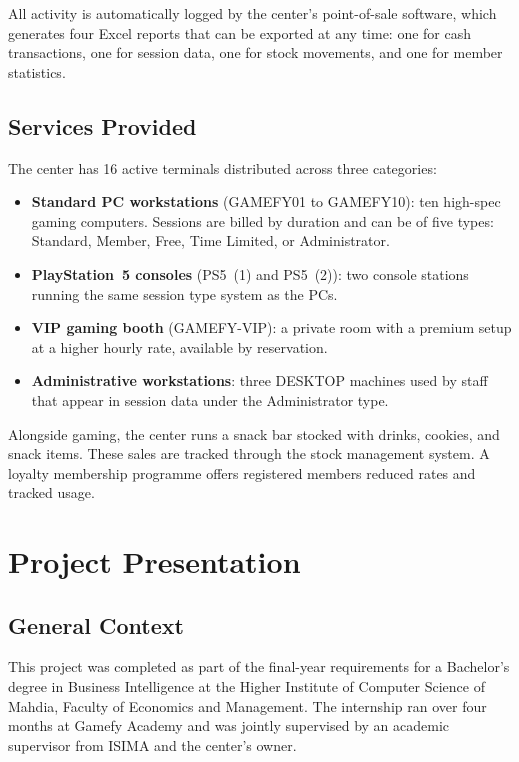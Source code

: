 \documentclass[12pt, a4paper]{report}
\begin{document}
All activity is automatically logged by the center's point-of-sale software, which
generates four Excel reports that can be exported at any time: one for cash
transactions, one for session data, one for stock movements, and one for member
statistics.

\subsection{Services Provided}

The center has 16 active terminals distributed across three categories:

\begin{itemize}
  \item \textbf{Standard PC workstations} (GAMEFY01 to GAMEFY10): ten high-spec
        gaming computers. Sessions are billed by duration and can be of five types:
        Standard, Member, Free, Time Limited, or Administrator.

  \item \textbf{PlayStation~5 consoles} (PS5~(1) and PS5~(2)): two console stations
        running the same session type system as the PCs.

  \item \textbf{VIP gaming booth} (GAMEFY-VIP): a private room with a premium setup
        at a higher hourly rate, available by reservation.

  \item \textbf{Administrative workstations}: three DESKTOP machines used by staff
        that appear in session data under the Administrator type.
\end{itemize}

Alongside gaming, the center runs a snack bar stocked with drinks, cookies, and
snack items. These sales are tracked through the stock management system. A loyalty
membership programme offers registered members reduced rates and tracked usage.

\section{Project Presentation}

\subsection{General Context}

This project was completed as part of the final-year requirements for a Bachelor's
degree in Business Intelligence at the Higher Institute of Computer Science of
Mahdia, Faculty of Economics and Management. The internship ran over four months at
Gamefy Academy and was jointly supervised by an academic supervisor from ISIMA and
the center's owner.
\end{document}
